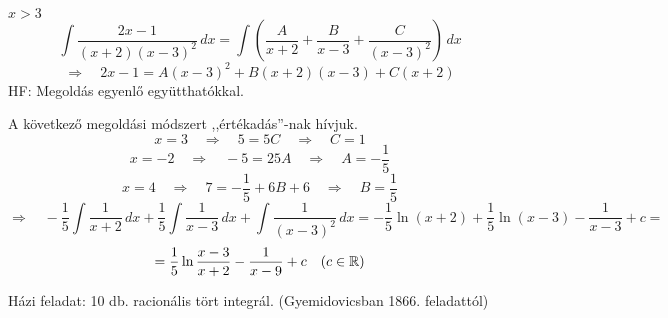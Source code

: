 \documentclass[a4paper,11.5pt]{article}
\begin{document}
	\begin{task}$x>3$
		\[ \int\frac{2x-1}{(x+2)(x-3)^2}\,dx=\int\left(\frac{A}{x+2}+\frac{B}{x-3}+\frac{C}{(x-3)^2}\right)\,dx \]
		\[ \Rightarrow\quad 2x-1=A(x-3)^2+B(x+2)(x-3)+C(x+2) \]
		HF: Megoldás egyenlő együtthatókkal.
		
		A következő megoldási módszert ,,értékadás''-nak hívjuk.
		\[ x=3\quad \Rightarrow\quad 5=5C\quad \Rightarrow \quad C=1 \]
		\[ x=-2\quad \Rightarrow\quad -5=25A\quad \Rightarrow\quad A=-\frac{1}{5} \]
		\[ x=4\quad \Rightarrow\quad 7=-\frac{1}{5}+6B+6\quad \Rightarrow\quad B=\frac{1}{5} \]
		\[ \Rightarrow\quad -\frac{1}{5}\int\frac{1}{x+2}\,dx+\frac{1}{5}\int\frac{1}{x-3}\,dx+\int\frac{1}{(x-3)^2}\,dx=-\frac{1}{5}\ln(x+2)+\frac{1}{5}\ln(x-3)-\frac{1}{x-3}+c= \]
		\[ = \frac{1}{5}\ln\frac{x-3}{x+2}-\frac{1}{x-9}+c\quad (c\in\mathbb{R}) \]
	\end{task}
	Házi feladat: 10 db. racionális tört integrál. (Gyemidovicsban 1866. feladattól)
\end{document}
